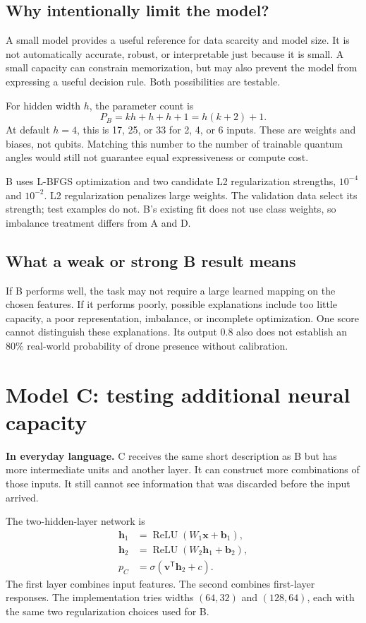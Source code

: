 \documentclass[11pt,letterpaper]{article}
\newcommand{\plain}[1]{\par\smallskip\noindent\textbf{In everyday language.} #1\par\smallskip}
\begin{document}
\subsection{Why intentionally limit the model?}
A small model provides a useful reference for data scarcity and model size.
It is not automatically accurate, robust, or interpretable just because it is
small. A small capacity can constrain memorization, but may also prevent the
model from expressing a useful decision rule. Both possibilities are testable.

For hidden width $h$, the parameter count is
\begin{equation}
 P_B=kh+h+h+1=h(k+2)+1.
\end{equation}
At default $h=4$, this is 17, 25, or 33 for 2, 4, or 6 inputs. These are
weights and biases, not qubits. Matching this number to the number of trainable
quantum angles would still not guarantee equal expressiveness or compute cost.

B uses L-BFGS optimization and two candidate L2 regularization strengths,
$10^{-4}$ and $10^{-2}$. L2 regularization penalizes large weights. The
validation data select its strength; test examples do not. B's existing fit
does not use class weights, so imbalance treatment differs from A and D.

\subsection{What a weak or strong B result means}
If B performs well, the task may not require a large learned mapping on the
chosen features. If it performs poorly, possible explanations include too
little capacity, a poor representation, imbalance, or incomplete optimization.
One score cannot distinguish these explanations. Its output 0.8 also does not
establish an 80\% real-world probability of drone presence without calibration.

\section{Model C: testing additional neural capacity}
\label{sec:modelc}
\plain{C receives the same short description as B but has more intermediate
units and another layer. It can construct more combinations of those inputs.
It still cannot see information that was discarded before the input arrived.}

The two-hidden-layer network is
\begin{align}
 \mathbf{h}_1&=\operatorname{ReLU}(W_1\mathbf{x}+\mathbf{b}_1),\\
 \mathbf{h}_2&=\operatorname{ReLU}(W_2\mathbf{h}_1+\mathbf{b}_2),\\
 p_C&=\sigma(\mathbf{v}^{\mathsf T}\mathbf{h}_2+c).
\end{align}
The first layer combines input features. The second combines first-layer
responses. The implementation tries widths $(64,32)$ and $(128,64)$, each
with the same two regularization choices used for B.
\end{document}
